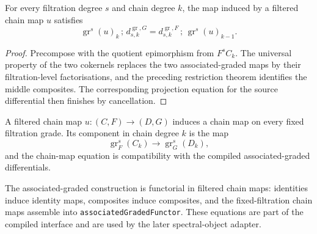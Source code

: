 \begin{theorem}
  \label{thm:filtered-associated-graded-map-comm}
  \leanok
  For every filtration degree $s$ and chain degree $k$, the map induced by a
  filtered chain map $u$ satisfies
  \[
    \operatorname{gr}^s(u)_k\,;\,d^{\operatorname{gr},G}_{s,k}
      =d^{\operatorname{gr},F}_{s,k}\,;\,\operatorname{gr}^s(u)_{k-1}.
  \]
\end{theorem}

\begin{proof}
  \leanok
  Precompose with the quotient epimorphism from $F^sC_k$.  The universal
  property of the two cokernels replaces the two associated-graded maps by
  their filtration-level factorisations, and the preceding restriction
  theorem identifies the middle composites.  The corresponding projection
  equation for the source differential then finishes by cancellation.
\end{proof}

\begin{definition}
  \label{def:filtered-associated-graded-chain-map}
  \leanok
  A filtered chain map $u:(C,F)\to(D,G)$ induces a chain map on every fixed
  filtration grade.  Its component in chain degree $k$ is the map
  \[
    \operatorname{gr}^s_F(C_k)\longrightarrow\operatorname{gr}^s_G(D_k),
  \]
  and the chain-map equation is compatibility with the compiled
  associated-graded differentials.
\end{definition}

\begin{definition}
  \label{def:filtered-associated-graded-functoriality}
  \leanok
  The associated-graded construction is functorial in filtered chain maps:
  identities induce identity maps, composites induce composites, and the
  fixed-filtration chain maps assemble into
  \texttt{associatedGradedFunctor}.  These equations are part of the compiled
  interface and are used by the later spectral-object adapter.
\end{definition}


